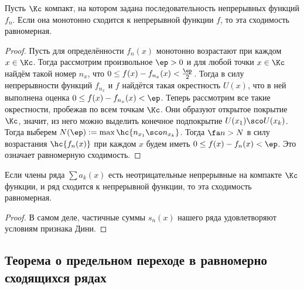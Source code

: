 \documentclass[a4paper]{article}
\begin{document}
\begin{theorem}
Пусть $\Kc$ компакт, на котором задана последовательность непрерывных функций $f_n$. Если она монотонно сходится к
непрерывной функции $f$, то эта сходимость равномерная.
\end{theorem}
\begin{proof}
Пусть для определённости $f_n(x)$ монотонно возрастают при каждом $x \in \Kc$. Тогда рассмотрим произвольное $\ep > 0$ и для любой точки
$x \in \Kc$ найдём такой номер $n_x$, что $0 \le f(x)-f_{n_x}(x) < \frac{\ep}{2}$. Тогда в силу непрерывности функций $f_{n_x}$ и $f$
найдётся такая окрестность $U(x)$, что в ней выполнена оценка $0 \le f(x)-f_{n_x}(x) < \ep$. Теперь рассмотрим все такие окрестности,
пробежав по всем точкам $\Kc$. Они образуют открытое покрытие $\Kc$, значит, из него можно выделить конечное
подпокрытие $U(x_1)\sco U(x_k)$. Тогда выберем $N(\ep) := \max \hc{n_{x_1}\sco n_{x_k}}$. Тогда $\fa n>N$ в силу возрастания
$\hc{f_n(x)}$ при каждом $x$ будем иметь $0 \le f(x) - f_n(x) < \ep$. Это означает равномерную сходимость.
\end{proof}

\begin{theorem}
Если члены ряда $\sum a_k(x)$ есть неотрицательные непрерывные на компакте $\Kc$ функции, и ряд сходится
к непрерывной функции, то эта сходимость равномерная.
\end{theorem}
\begin{proof}
В самом деле, частичные суммы $s_n(x)$ нашего ряда удовлетворяют условиям признака Дини.
\end{proof}

\subsection{Теорема о предельном переходе в равномерно сходящихся рядах}
\end{document}
